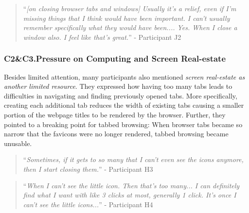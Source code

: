 \begin{quote}
``\emph{[on closing browser tabs and windows] Usually it's a relief, even if I'm missing things that I think would have been important. I can't usually remember specifically what they would have been.... Yes. When I close a window also. I feel like that's great.}'' - Participant J2
\end{quote}


\subsubsection{C2\&C3.Pressure on Computing and Screen Real-estate}

Besides limited attention, many participants also mentioned \emph{screen real-estate as another limited resource}. They expressed how having too many tabs leads to difficulties in navigating and finding previously opened tabs. More specifically, creating each additional tab reduces the width of existing tabs causing a smaller portion of the webpage titles to be rendered by the browser. Further, they pointed to a breaking point for tabbed browsing: When browser tabs became so narrow that the favicons were no longer rendered, tabbed browsing became unusable. 


\begin{quote}
``\emph{Sometimes, if it gets to so many that I can't even see the icons anymore, then I start closing them.}'' - Participant H3
\end{quote}


\begin{quote}
``\emph{When I can't see the little icon. Then that's too many... I can definitely find what I want with like 3 clicks at most, generally 1 click. It's once I can't see the little icons...}'' - Participant H4
\end{quote}

